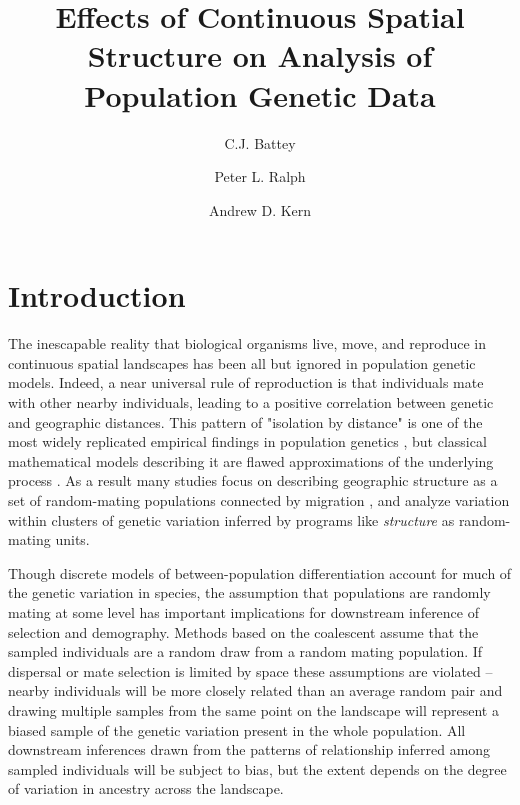 \documentclass[11pt,twoside,lineno]{preprint}
\title{Effects of Continuous Spatial Structure on Analysis of Population Genetic Data}
\author[$\ast$,1]{C.J. Battey}
\author[$\ast$]{Peter L. Ralph}
\author[$\ast$]{Andrew D. Kern}
\affil[$\ast$]{University of Oregon Dept. Biology, Institute for Ecology Evolution}
\begin{document}
\maketitle
\thispagestyle{firststyle}
\firstpagefootnote


\vspace{-35pt}%

\section{Introduction}
The inescapable reality that biological organisms live, move, and reproduce in continuous spatial landscapes has been all but ignored in population genetic models. Indeed, a near universal rule of reproduction is that individuals mate with other nearby individuals, leading to a positive correlation between genetic and geographic distances. This pattern of "isolation by distance" \citep{Wright1943} is one of the most widely replicated empirical findings in population genetics \citep{Chen2017,Jay2012,Sharbel2000}, but classical mathematical models describing it are flawed approximations of the underlying process \citep{Felsenstein1975}.
As a result many studies focus on describing geographic structure as a set of random-mating populations connected by migration \citep{Malecot1948,Wright1931}, and analyze variation within clusters of genetic variation inferred by programs like \textit{structure} \citep{Pritchard2000} as random-mating units. 

Though discrete models of between-population differentiation account for much of the genetic variation in species, the assumption that populations are randomly mating at some level has important implications for downstream inference of selection and demography. Methods based on the coalescent \citep{Kingman1982} assume that the sampled individuals are a random draw from a random mating population. If dispersal or mate selection is limited by space these assumptions are violated -- nearby individuals will be more closely related than an average random pair and drawing multiple samples from the same point on the landscape will represent a biased sample of the genetic variation present in the whole population. All downstream inferences drawn from the patterns of relationship inferred among sampled individuals will be subject to bias, but the extent depends on the degree of variation in ancestry across the landscape. 
\end{document}
